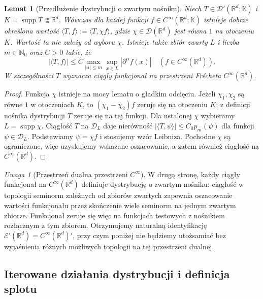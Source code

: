 \documentclass[11pt,a4paper]{article}
\numberwithin{equation}{section}
\theoremstyle{plain}
\newtheorem{lemat}[twierdzenie]{Lemat}
\theoremstyle{definition}
\theoremstyle{remark}
\newtheorem{uwaga}[twierdzenie]{Uwaga}
\newcommand{\R}{\mathbb R}
\newcommand{\N}{\mathbb N}
\newcommand{\K}{\mathbb K}
\DeclareMathOperator{\supp}{supp}
\begin{document}
\begin{lemat}[Przedłużenie dystrybucji o zwartym nośniku]
\label{lem:compact-action21}
Niech $T\in\mathcal D'(\R^d;\K)$ i
$K=\supp T\Subset\R^d$. Wówczas dla każdej funkcji
$f\in C^\infty(\R^d;\K)$ istnieje dobrze określona wartość
$\langle T,f\rangle:=\langle T,\chi f\rangle$, gdzie
$\chi\in\mathcal D(\R^d)$ jest równa $1$ na otoczeniu $K$.
Wartość ta nie zależy od wyboru $\chi$. Istnieje także
zbiór zwarty $L$ i liczba $m\in\N_0$ oraz $C>0$ takie, że
\[
 |\langle T,f\rangle|\le
 C\max_{|\alpha|\le m}\sup_{x\in L}|\partial^\alpha f(x)|
 \quad(f\in C^\infty(\R^d)).
\]
W szczególności $T$ wyznacza ciągły funkcjonał na
przestrzeni Frécheta $C^\infty(\R^d)$.
\end{lemat}
\begin{proof}
Funkcja $\chi$ istnieje na mocy lematu o gładkim odcięciu.
Jeżeli $\chi_1,\chi_2$ są równe $1$ w otoczeniach $K$,
to $(\chi_1-\chi_2)f$ zeruje się na otoczeniu $K$;
z definicji nośnika dystrybucji $T$ zeruje się na tej funkcji.
Dla ustalonej $\chi$ wybieramy $L=\supp\chi$.
Ciągłość $T$ na $\mathcal D_L$ daje nierówność
$|\langle T,\psi\rangle|\le C_0p_m(\psi)$ dla funkcji
$\psi\in\mathcal D_L$. Podstawiamy $\psi=\chi f$
i stosujemy wzór Leibniza. Pochodne $\chi$ są ograniczone,
więc uzyskujemy wskazane oszacowanie, a zatem również
ciągłość na $C^\infty(\R^d)$.
\end{proof}

\begin{uwaga}[Przestrzeń dualna przestrzeni $C^\infty$]
\label{rem:Eprime21}
W drugą stronę, każdy ciągły funkcjonał na
$C^\infty(\R^d)$ definiuje dystrybucję o zwartym nośniku:
ciągłość w topologii seminorm zależnych od zbiorów zwartych
zapewnia oszacowanie wartości funkcjonału przez skończenie
wiele seminorm na jednym zwartym zbiorze. Funkcjonał
zeruje się więc na funkcjach testowych z nośnikiem
rozłącznym z tym zbiorem. Otrzymujemy naturalną identyfikację
$\mathcal E'(\R^d)=C^\infty(\R^d)'$, przy czym poniżej
nie będziemy utożsamiać bez wyjaśnienia różnych możliwych
topologii na tej przestrzeni dualnej.
\end{uwaga}

\subsection{Iterowane działania dystrybucji i definicja splotu}
\end{document}
